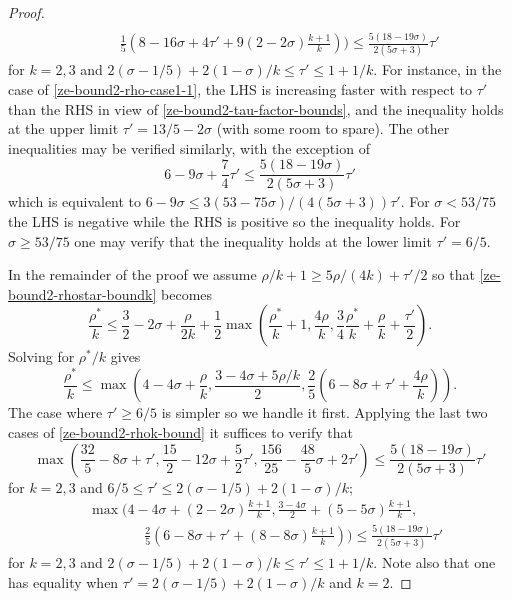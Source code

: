 \begin{proof}
\begin{equation*}
\begin{split}
\\
&\qquad\frac{1}{5}(8 - 16\sigma + 4\tau' + 9(2 - 2\sigma)\frac{k + 1}{k})) \le \frac{5(18 - 19\sigma)}{2(5\sigma + 3)}\tau'
\end{split}
\end{equation*}
for $k = 2, 3$ and $2(\sigma - 1/5) + 2(1-\sigma)/k \le \tau' \le 1 + 1/k$. For instance, in the case of \eqref{ze-bound2-rho-case1-1}, the LHS is increasing faster with respect to $\tau'$ than the RHS in view of \eqref{ze-bound2-tau-factor-bounds}, and the inequality holds at the upper limit $\tau' = 13/5 - 2\sigma$ (with some room to spare). The other inequalities may be verified similarly, with the exception of 
\[
6 - 9\sigma + \frac{7}{4}\tau' \le \frac{5(18 - 19\sigma)}{2(5\sigma + 3)}\tau'
\]
which is equivalent to $6 - 9\sigma \le 3(53 - 75\sigma)/(4(5\sigma + 3))\tau'$. For $\sigma < 53/75$ the LHS is negative while the RHS is positive so the inequality holds. For $\sigma \ge 53/75$ one may verify that the inequality holds at the lower limit $\tau' = 6/5$.

In the remainder of the proof we assume $\rho/k  + 1 \ge 5\rho/(4k) + \tau'/2$ so that \eqref{ze-bound2-rhostar-boundk} becomes 
\[
\frac{\rho^*}{k} \le \frac{3}{2} - 2\sigma + \frac{\rho}{2k} + \frac{1}{2}\max\left(\frac{\rho^*}{k}+1, \frac{4\rho}{k}, \frac{3}{4}\frac{\rho^*}{k} +\frac{\rho}{k}+\frac{\tau'}{2}\right).
\]
Solving for $\rho^*/k$ gives 
\begin{equation}\label{ze-bound2-rho-star-bound}
\frac{\rho^*}{k} \le \max\left(4 - 4\sigma + \frac{\rho}{k}, \frac{3 - 4\sigma + 5\rho/k}{2}, \frac{2}{5}(6 - 8\sigma + \tau' + \frac{4\rho}{k})\right).
\end{equation}
The case where $\tau' \ge 6/5$ is simpler so we handle it first. Applying the last two cases of \eqref{ze-bound2-rhok-bound} it suffices to verify that
\[
\max\left(\frac{32}{5} - 8\sigma + \tau', \frac{15}{2} - 12\sigma + \frac{5}{2}\tau', \frac{156}{25} - \frac{48}{5}\sigma + 2\tau'\right) \le \frac{5(18 - 19\sigma)}{2(5\sigma + 3)}\tau'
\]
for $k = 2, 3$ and $6/5 \le \tau' \le 2(\sigma - 1/5) + 2(1 - \sigma)/k$; 
\begin{align*}
&\max(4 - 4\sigma + (2 - 2\sigma)\frac{k + 1}{k}, \frac{3 - 4\sigma}{2} + (5 - 5\sigma)\frac{k + 1}{k}, \\
&\qquad\qquad\frac{2}{5}(6 - 8\sigma + \tau' + (8 - 8\sigma)\frac{k + 1}{k})) \le \frac{5(18 - 19\sigma)}{2(5\sigma + 3)}\tau'
\end{align*}
for $k = 2, 3$ and $2(\sigma - 1/5) + 2(1 - \sigma)/k \le \tau' \le 1 + 1/k$. Note also that one has equality when $\tau' = 2(\sigma - 1/5) + 2(1 - \sigma)/k$ and $k = 2$. 


\end{proof}
